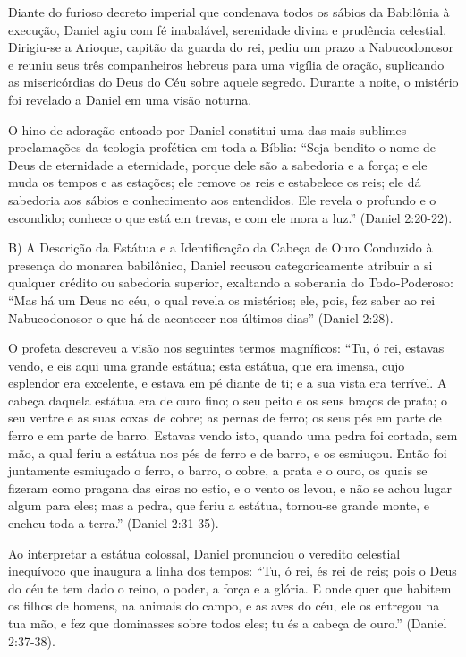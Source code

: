 Diante do furioso decreto imperial que condenava todos os sábios da Babilônia à execução, Daniel agiu com fé inabalável, serenidade divina e prudência celestial. Dirigiu-se a Arioque, capitão da guarda do rei, pediu um prazo a Nabucodonosor e reuniu seus três companheiros hebreus para uma vigília de oração, suplicando as misericórdias do Deus do Céu sobre aquele segredo. Durante a noite, o mistério foi revelado a Daniel em uma visão noturna.

O hino de adoração entoado por Daniel constitui uma das mais sublimes proclamações da teologia profética em toda a Bíblia:
``Seja bendito o nome de Deus de eternidade a eternidade, porque dele são a sabedoria e a força; e ele muda os tempos e as estações; ele remove os reis e estabelece os reis; ele dá sabedoria aos sábios e conhecimento aos entendidos. Ele revela o profundo e o escondido; conhece o que está em trevas, e com ele mora a luz.'' (Daniel 2:20-22).

B) A Descrição da Estátua e a Identificação da Cabeça de Ouro
Conduzido à presença do monarca babilônico, Daniel recusou categoricamente atribuir a si qualquer crédito ou sabedoria superior, exaltando a soberania do Todo-Poderoso: ``Mas há um Deus no céu, o qual revela os mistérios; ele, pois, fez saber ao rei Nabucodonosor o que há de acontecer nos últimos dias'' (Daniel 2:28).

O profeta descreveu a visão nos seguintes termos magníficos:
``Tu, ó rei, estavas vendo, e eis aqui uma grande estátua; esta estátua, que era imensa, cujo esplendor era excelente, e estava em pé diante de ti; e a sua vista era terrível. A cabeça daquela estátua era de ouro fino; o seu peito e os seus braços de prata; o seu ventre e as suas coxas de cobre; as pernas de ferro; os seus pés em parte de ferro e em parte de barro. Estavas vendo isto, quando uma pedra foi cortada, sem mão, a qual feriu a estátua nos pés de ferro e de barro, e os esmiuçou. Então foi juntamente esmiuçado o ferro, o barro, o cobre, a prata e o ouro, os quais se fizeram como pragana das eiras no estio, e o vento os levou, e não se achou lugar algum para eles; mas a pedra, que feriu a estátua, tornou-se grande monte, e encheu toda a terra.'' (Daniel 2:31-35).

Ao interpretar a estátua colossal, Daniel pronunciou o veredito celestial inequívoco que inaugura a linha dos tempos:
``Tu, ó rei, és rei de reis; pois o Deus do céu te tem dado o reino, o poder, a força e a glória. E onde quer que habitem os filhos de homens, na animais do campo, e as aves do céu, ele os entregou na tua mão, e fez que dominasses sobre todos eles; tu és a cabeça de ouro.'' (Daniel 2:37-38).

